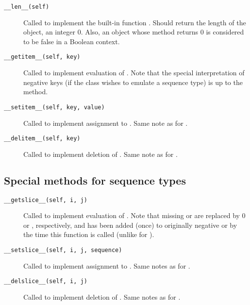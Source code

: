 \begin{description}

\item[{\tt __len__(self)}]
Called to implement the built-in function .  Should return
the length of the object, an integer \code{>=} 0.  Also, an object
whose  method returns 0 is considered to be false in a
Boolean context.

\item[{\tt __getitem__(self, key)}]
Called to implement evaluation of .  Note that the
special interpretation of negative keys (if the class wishes to
emulate a sequence type) is up to the  method.

\item[{\tt __setitem__(self, key, value)}]
Called to implement assignment to .  Same note as for
.

\item[{\tt __delitem__(self, key)}]
Called to implement deletion of .  Same note as for
.

\end{description}


\subsection{Special methods for sequence types}

\begin{description}

\item[{\tt __getslice__(self, i, j)}]
Called to implement evaluation of .  Note that missing
 or  are replaced by 0 or ,
respectively, and  has been added (once) to originally
negative  or  by the time this function is called
(unlike for ).

\item[{\tt __setslice__(self, i, j, sequence)}]
Called to implement assignment to .  Same notes as for
.

\item[{\tt __delslice__(self, i, j)}]
Called to implement deletion of .  Same notes as for
.

\end{description}


